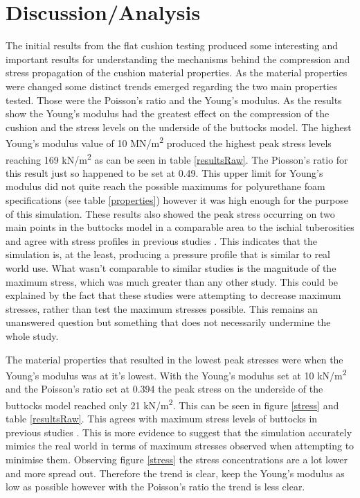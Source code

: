 \documentclass[conference]{IEEEtran}
\begin{document}
\section{Discussion/Analysis}
The initial results from the flat cushion testing produced some interesting and important results for understanding the mechanisms behind the compression and stress propagation of the cushion material properties. As the material properties were changed some distinct trends emerged regarding the two main properties tested. Those were the Poisson's ratio and the Young's modulus. As the results show the Young's modulus had the greatest effect on the compression of the cushion and the stress levels on the underside of the buttocks model. The highest Young's modulus value of 10 MN/m\textsuperscript{2} produced the highest peak stress levels reaching 169 kN/m\textsuperscript{2} as can be seen in table \ref{resultsRaw}. The Piosson's ratio for this result just so happened to be set at 0.49. This upper limit for Young's modulus did not quite reach the possible maximums for polyurethane foam specifications (see table \ref{properties}) however it was high enough for the purpose of this simulation. These results also showed the peak stress occurring on two main points in the buttocks model in a comparable area to the ischial tuberosities and agree with stress profiles in previous studies \cite{HermanMiller2013,Nigel2002}. This indicates that the simulation is, at the least, producing a pressure profile that is similar to real world use. What wasn't comparable to similar studies is the magnitude of the maximum stress, which was much greater than any other study. This could be explained by the fact that these studies were attempting to decrease maximum stresses, rather than test the maximum stresses possible. This remains an unanswered question but something that does not necessarily undermine the whole study.

The material properties that resulted in the lowest peak stresses were when the Young's modulus was at it's lowest. With the Young's modulus set at 10 kN/m\textsuperscript{2} and the Poisson's ratio set at 0.394 the peak stress on the underside of the buttocks model reached only 21 kN/m\textsuperscript{2}. This can be seen in figure \ref{stress} and table \ref{resultsRaw}. This agrees with maximum stress levels of buttocks in previous studies \cite{Nigel2002}. This is more evidence to suggest that the simulation accurately mimics the real world in terms of maximum stresses observed when attempting to minimise them. Observing figure \ref{stress} the stress concentrations are a lot lower and more spread out. Therefore the trend is clear, keep the Young's modulus as low as possible however with the Poisson's ratio the trend is less clear. 
\end{document}
